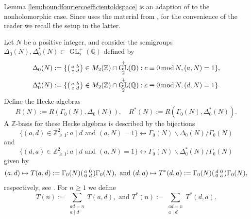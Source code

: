 \documentclass{article}
\theoremstyle{named}
\newcommand{\Z}{\mathbb{Z}}
\newcommand{\Q}{\mathbb{Q}}
\DeclareMathOperator{\GL}{GL}
\DeclareMathOperator{\modulo}{mod}
\begin{document}
Lemma \ref{lem:boundfouriercoefficientoldspace} is an adaption of \cite[Theorem 5.1]{Schulze_Pillot_Petersson} to the nonholomorphic case. Since \cite{Schulze_Pillot_Petersson} uses the material from \cite[Sections 4.5 and 4.6]{miyake}, for the convenience of the reader we recall the setup in the latter. 

Let $N$ be a positive integer, and consider the semigroups $\Delta_0(N), \Delta^*_0(N) \subset \GL_2^+(\Q)$ defined by 
\begin{equation*}
\begin{aligned}
\Delta_0(N) & := \{\begin{psmallmatrix}
    a & b\\
    c & d
\end{psmallmatrix}\in M_2(\Z)\cap \GL_2^+(\Q) : c \equiv 0 \modulo N, (a, N) = 1\},\\
\Delta^*_0(N) & := \{\begin{psmallmatrix}
    a & b\\
    c & d
\end{psmallmatrix}\in M_2(\Z)\cap \GL_2^+(\Q) : c \equiv 0 \modulo N, (d, N) = 1\}.
\end{aligned}
\end{equation*}
Define the Hecke algebras 
\begin{equation*}
    R(N) := R(\Gamma_0(N), \Delta_0(N)), \quad R^*(N) := R(\Gamma_0(N), \Delta^*_0(N)).
\end{equation*}
A $\Z$-basis for these Hecke algebras is described by the bijections
\begin{equation*}
    \{(a, d) \in \Z^2_{\geq 1}: a \mid d \text{ and }(a, N) = 1\} \longleftrightarrow \Gamma_0(N)\backslash \Delta_0(N)/\Gamma_0(N)
\end{equation*}
and 
\begin{equation*}
    \{(d, a) \in \Z^2_{\geq 1}: a \mid d \text{ and }(a, N) = 1\} \longleftrightarrow \Gamma_0(N)\backslash \Delta^*_0(N)/\Gamma_0(N)
\end{equation*} 
given by
\begin{equation*}
    (a, d)  \mapsto T(a, d) := \Gamma_0(N) \begin{psmallmatrix}
        a & 0\\
        0 & d
    \end{psmallmatrix}\Gamma_0(N), \text{ and }
    (d, a) \mapsto T^*(d, a)  := \Gamma_0(N) \begin{psmallmatrix}
        d & 0\\
        0 & a
    \end{psmallmatrix}\Gamma_0(N),
\end{equation*}
respectively, see \cite[Lemma 4.5.2]{miyake}. For $n \geq 1$ we define 
\begin{equation*}
    T(n) := \sum_{\substack{ad = n\\
    a \mid d}}T(a, d), \text{ and } T^*(n) := \sum_{\substack{ad = n\\
    a \mid d}}T^*(d, a).
\end{equation*}
\end{document}
